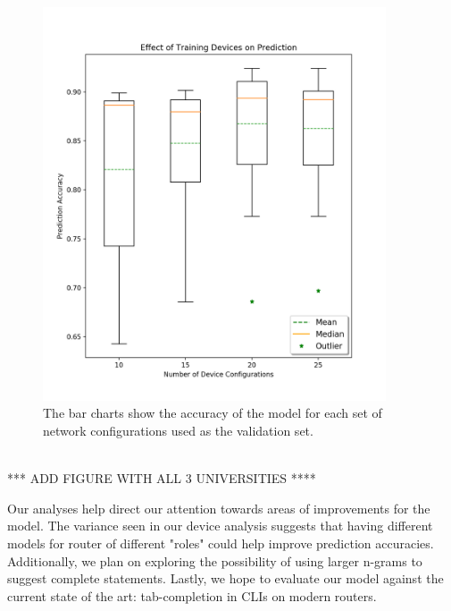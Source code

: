 \begin{figure}[H]
	\centering
	\includegraphics[width=4in]{umn_analysis.png}
	\caption{The bar charts show the accuracy of the model for each set of network configurations used as the validation set.}
\end{figure}\\

*** ADD FIGURE WITH ALL 3 UNIVERSITIES ****

Our analyses help direct our attention towards areas of improvements for the model. The variance seen in our device analysis suggests that having different models for router of different "roles" could help improve prediction accuracies. Additionally, we plan on exploring the possibility of using larger n-grams to suggest complete statements. Lastly, we hope to evaluate our model against the current state of the art: tab-completion in CLIs on modern routers.
 